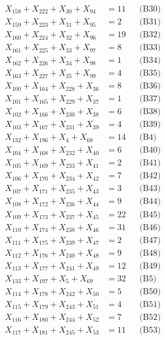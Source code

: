\documentclass[a4paper,10pt]{article}
\begin{document}
{\begin{align}
X_{158} + X_{222} + X_{30} + X_{94} &= 11 && \text{(B30)} \\
X_{159} + X_{223} + X_{31} + X_{95} &= 2 && \text{(B31)} \\
X_{160} + X_{224} + X_{32} + X_{96} &= 19 && \text{(B32)} \\
X_{161} + X_{225} + X_{33} + X_{97} &= 8 && \text{(B33)} \\
X_{162} + X_{226} + X_{34} + X_{98} &= 1 && \text{(B34)} \\
X_{163} + X_{227} + X_{35} + X_{99} &= 4 && \text{(B35)} \\
X_{100} + X_{164} + X_{228} + X_{36} &= 8 && \text{(B36)} \\
X_{101} + X_{165} + X_{229} + X_{37} &= 1 && \text{(B37)} \\
X_{102} + X_{166} + X_{230} + X_{38} &= 6 && \text{(B38)} \\
X_{103} + X_{167} + X_{231} + X_{39} &= 4 && \text{(B39)} \\
X_{132} + X_{196} + X_{4} + X_{68} &= 14 && \text{(B4)} \\
X_{104} + X_{168} + X_{232} + X_{40} &= 6 && \text{(B40)} \\
\allowbreak
X_{105} + X_{169} + X_{233} + X_{41} &= 2 && \text{(B41)} \\
X_{106} + X_{170} + X_{234} + X_{42} &= 7 && \text{(B42)} \\
X_{107} + X_{171} + X_{235} + X_{43} &= 3 && \text{(B43)} \\
X_{108} + X_{172} + X_{236} + X_{44} &= 9 && \text{(B44)} \\
X_{109} + X_{173} + X_{237} + X_{45} &= 22 && \text{(B45)} \\
X_{110} + X_{174} + X_{238} + X_{46} &= 31 && \text{(B46)} \\
X_{111} + X_{175} + X_{239} + X_{47} &= 2 && \text{(B47)} \\
X_{112} + X_{176} + X_{240} + X_{48} &= 9 && \text{(B48)} \\
X_{113} + X_{177} + X_{241} + X_{49} &= 12 && \text{(B49)} \\
X_{133} + X_{197} + X_{5} + X_{69} &= 32 && \text{(B5)} \\
X_{114} + X_{178} + X_{242} + X_{50} &= 5 && \text{(B50)} \\
X_{115} + X_{179} + X_{243} + X_{51} &= 4 && \text{(B51)} \\
X_{116} + X_{180} + X_{244} + X_{52} &= 7 && \text{(B52)} \\
X_{117} + X_{181} + X_{245} + X_{53} &= 11 && \text{(B53)} \\

\end{align}}
\end{document}
